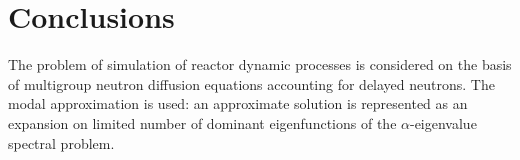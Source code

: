 \documentclass[a4paper]{jpconf}
\begin{document}
\section{Conclusions} 

The problem of simulation of reactor dynamic processes is considered on the basis of multigroup neutron diffusion equations accounting for delayed neutrons.
The modal approximation is used: an approximate solution is represented as an expansion on limited number of dominant eigenfunctions of the $\alpha$-eigenvalue spectral problem.

%
%
%
\end{document}

